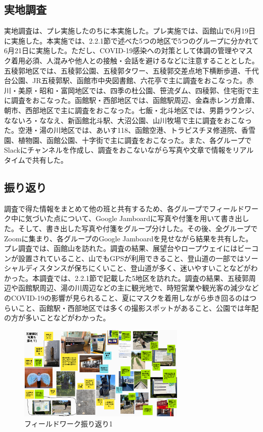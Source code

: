 
\subsection{実地調査}
実地調査は、プレ実施したのちに本実施した。プレ実施では、函館山で6月19日に実施した。本実施では、2.2.1節で述べた5つの地区で5つのグループに分かれて6月21日に実施した。ただし、COVID-19感染への対策として体調の管理やマスク着用必須、人混みや他人との接触・会話を避けるなどに注意することとした。五稜郭地区では、五稜郭公園、五稜郭タワー、五稜郭交差点地下横断歩道、千代台公園、JR五稜郭駅、函館市中央図書館、六花亭で主に調査をおこなった。赤川・美原・昭和・富岡地区では、四季の杜公園、笹流ダム、四稜郭、住宅街で主に調査をおこなった。函館駅・西部地区では、函館駅周辺、金森赤レンガ倉庫、朝市、西部地区で主に調査をおこなった。七飯・北斗地区では、男爵ラウンジ、なないろ・ななえ、新函館北斗駅、大沼公園、山川牧場で主に調査をおこなった。空港・湯の川地区では、あいす118、函館空港、トラピスチヌ修道院、香雪園、植物園、函館公園、十字街で主に調査をおこなった。また、各グループでSlackにチャンネルを作成し、調査をおこないながら写真や文章で情報をリアルタイムで共有した。


\subsection{振り返り}
調査で得た情報をまとめて他の班と共有するため、各グループでフィールドワーク中に気づいた点について、Google Jamboardに写真や付箋を用いて書き出した。そして、書き出した写真や付箋をグループ分けした。その後、全グループでZoomに集まり、各グループのGoogle Jamboardを見せながら結果を共有した。プレ調査では、函館山を訪れた。調査の結果、展望台やロープウェイにはビーコンが設置されていること、山でもGPSが利用できること、登山道の一部ではソーシャルディスタンスが保ちにくいこと、登山道が多く、迷いやすいことなどがわかった。本調査では、2.2.1節で記載した5地区を訪れた。調査の結果、五稜郭周辺や函館駅周辺、湯の川周辺などの主に観光地で、時短営業や観光客の減少などのCOVID-19の影響が見られること、夏にマスクを着用しながら歩き回るのはつらいこと、函館駅・西部地区では多くの撮影スポットがあること、公園では年配の方が多いことなどがわかった。


\begin{figure}[htbp]
    \begin{center}
    \includegraphics[width=8cm]{images/FW1.png}
    \end{center}
    \caption{フィールドワーク振り返り1}
    \label{fig:furikaeri1}
\end{figure}

